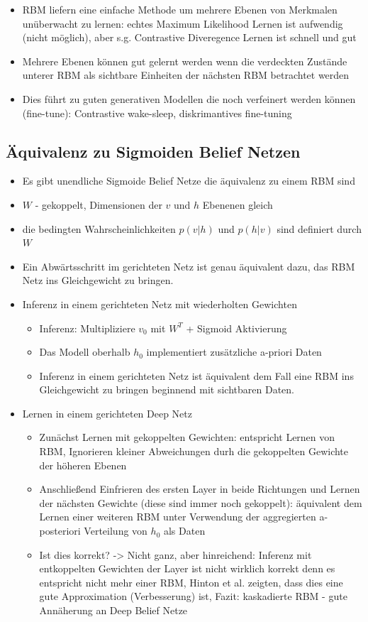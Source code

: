 \documentclass[paper=a4, fontsize=11pt]{scrartcl} %
\numberwithin{equation}{section} %
\numberwithin{figure}{section} %
\numberwithin{table}{section} %
\begin{document}
\begin{itemize}
\item RBM liefern eine einfache Methode um mehrere Ebenen von Merkmalen unüberwacht zu lernen: echtes Maximum Likelihood Lernen ist aufwendig (nicht möglich), aber s.g. Contrastive Diveregence Lernen ist schnell und gut
\item Mehrere Ebenen können gut gelernt werden wenn die verdeckten Zustände unterer RBM als sichtbare Einheiten der nächsten RBM betrachtet werden
\item Dies führt zu guten generativen Modellen die noch verfeinert werden können (fine-tune): Contrastive wake-sleep, diskrimantives fine-tuning
\end{itemize}

\subsection{Äquivalenz zu Sigmoiden Belief Netzen}

\begin{itemize}
\item Es gibt unendliche Sigmoide Belief Netze die äquivalenz zu einem RBM sind
\item $W$ - gekoppelt, Dimensionen der $v$ und $h$ Ebenenen gleich
\item die bedingten Wahrscheinlichkeiten $p(v|h)$ und $p(h|v)$ sind definiert durch $W$
\item Ein Abwärtsschritt im gerichteten Netz ist genau äquivalent dazu, das RBM Netz ins Gleichgewicht zu bringen.
\item Inferenz in einem gerichteten Netz mit wiederholten Gewichten
\begin{itemize}
\item Inferenz: Multipliziere $v_0$ mit $W^T$ + Sigmoid Aktivierung
\item Das Modell oberhalb $h_0$ implementiert zusätzliche a-priori Daten
\item Inferenz in einem gerichteten Netz ist äquivalent dem Fall eine RBM ins Gleichgewicht zu bringen beginnend mit sichtbaren Daten.
\end{itemize}
\item Lernen in einem gerichteten Deep Netz
\begin{itemize}
\item Zunächst Lernen mit gekoppelten Gewichten: entspricht Lernen von RBM, Ignorieren kleiner Abweichungen durh die gekoppelten Gewichte der höheren Ebenen
\item Anschließend Einfrieren des ersten Layer in beide Richtungen und Lernen der nächsten Gewichte (diese sind immer noch gekoppelt): äquivalent dem Lernen einer weiteren RBM unter Verwendung der aggregierten a-posteriori Verteilung von $h_0$ als Daten
\item Ist dies korrekt? -> Nicht ganz, aber hinreichend: Inferenz mit entkoppelten Gewichten der Layer ist nicht wirklich korrekt denn es entspricht nicht mehr einer RBM, Hinton et al. zeigten, dass dies eine gute Approximation (Verbesserung) ist, Fazit: kaskadierte RBM - gute Annäherung an Deep Belief Netze
\end{itemize}
\end{itemize}
\end{document}
